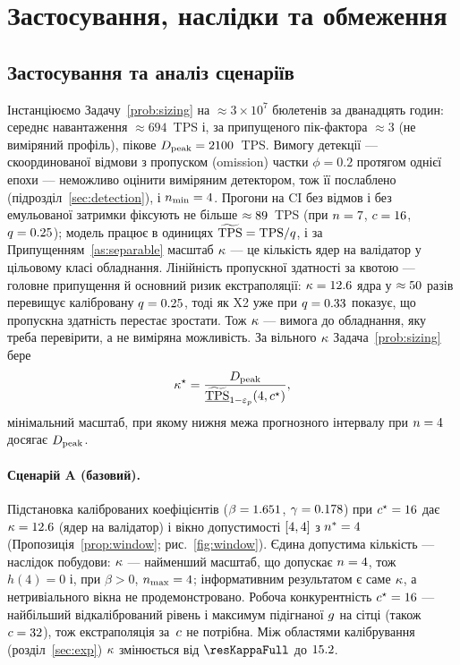 \section{Застосування, наслідки та обмеження}
\label{sec:case}

\subsection{Застосування та аналіз сценаріїв}

Інстанціюємо Задачу~\ref{prob:sizing} на $\approx3\times10^{7}$ бюлетенів за
дванадцять годин: середнє навантаження $\approx694$~TPS і, за припущеного
пік-фактора $\approx3$ (не виміряний профіль), пікове
$D_{\mathrm{peak}}=2100$~TPS. Вимогу детекції --- скоординованої відмови з пропуском
(omission) частки $\phi=0.2$ протягом однієї епохи --- неможливо оцінити
виміряним детектором, тож її послаблено (підрозділ~\ref{sec:detection}), і
$\nmin=\resNminCase$. Прогони на CI без відмов і без
емульованої затримки фіксують не більше $\approx89$~TPS (при
$n=7$, $c=16$, $q=0.25$); модель працює в
одиницях \RNM{} $\widetilde{\mathrm{TPS}}=\mathrm{TPS}/q$, і за Припущенням~\ref{as:separable} масштаб
$\kappa$ --- це кількість ядер на валідатор у цільовому класі обладнання.
Лінійність пропускної здатності за квотою --- головне припущення й основний
ризик екстраполяції: $\kappa=12.6$ ядра у
$\approx50$ разів перевищує калібровану $q=0.25$, тоді як X2
уже при $q=0.33$ показує, що пропускна здатність перестає зростати. Тож
$\kappa$ --- вимога до обладнання, яку треба перевірити, а не виміряна
можливість. За вільного
$\kappa$ Задача~\ref{prob:sizing} бере
\begin{equation}
\kappaScale^{\star}
=\frac{\Dpk}{\underline{\TPSn}_{1-\epsp}(4,\cc^{\star})},
\label{eq:kappa}
\end{equation}
мінімальний масштаб, при якому нижня межа прогнозного інтервалу при $n=4$
досягає $D_{\mathrm{peak}}$.

\paragraph{Сценарій A (базовий).}
Підстановка каліброваних коефіцієнтів
($\beta=1.651$, $\gamma=0.178$) при $c^{\star}=16$ дає
$\kappa=12.6$ (ядер на валідатор) і вікно допустимості
$[4,4]$ з $n^{\ast}=4$
(Пропозиція~\ref{prop:window}; рис.~\ref{fig:window}). Єдина допустима
кількість --- наслідок побудови: $\kappa$ --- найменший масштаб, що
допускає $n=4$, тож $h(4)=0$ і, при $\beta>0$, $\nmax=4$; інформативним
результатом є саме $\kappa$, а нетривіального вікна не продемонстровано.
Робоча конкурентність $c^{\star}=16$ --- найбільший відкалібрований
рівень і максимум підігнаної $g$ на сітці (також $c=32$), тож
екстраполяція за~$c$ не потрібна. Між областями калібрування
(розділ~\ref{sec:exp}) $\kappa$ змінюється від $\resKappaFull$ до
$15.2$.


